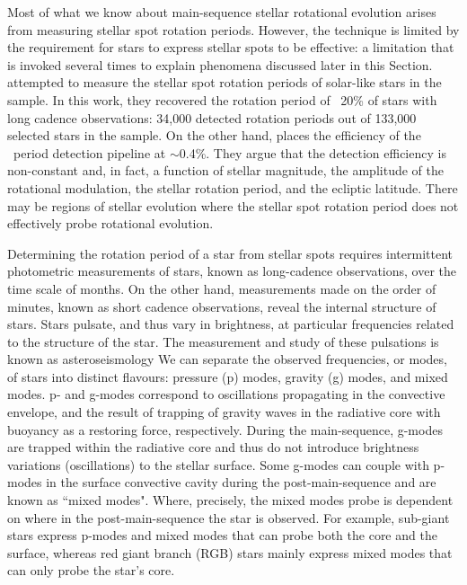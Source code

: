 Most of what we know about main-sequence stellar rotational evolution arises from measuring stellar spot rotation periods.
However, the technique is limited by the requirement for stars to express stellar spots to be effective: a limitation that is invoked several times to explain phenomena discussed later in this Section. 
\citet{mcquillan_rotation_2014} attempted to measure the stellar spot rotation periods of solar-like stars in the \kepler{} sample.
In this work, they recovered the rotation period of ~20\% of stars with long cadence observations: 34,000 detected rotation periods out of 133,000 selected stars in the sample.
On the other hand, \citet{distefano_gaia_2022} places the efficiency of the \GDRT\ period detection pipeline at $\sim$0.4\%.
They argue that the detection efficiency is non-constant and, in fact, a function of stellar magnitude, the amplitude of the rotational modulation, the stellar rotation period, and the ecliptic latitude.
There may be regions of stellar evolution where the stellar spot rotation period does not effectively probe rotational evolution.

Determining the rotation period of a star from stellar spots requires intermittent photometric measurements of stars, known as long-cadence observations, over the time scale of months. 
On the other hand, measurements made on the order of minutes, known as short cadence observations, reveal the internal structure of stars.
Stars pulsate, and thus vary in brightness, at particular frequencies related to the structure of the star. 
The measurement and study of these pulsations is known as asteroseismology \citep[see, e.g.][for thorough overviews]{christensen-dalsgaard_interpretation_1982,christensen-dalsgaard_comparison_1990, aerts_asteroseismology_2010, basu_asteroseismic_2017}
We can separate the observed frequencies, or modes, of stars into distinct flavours: pressure (p) modes, gravity (g) modes, and mixed modes.
p- and g-modes correspond to oscillations propagating in the convective envelope, and the result of trapping of gravity waves in the radiative core with buoyancy as a restoring force, respectively. 
During the main-sequence, g-modes are trapped within the radiative core and thus do not introduce brightness variations (oscillations) to the stellar surface.
Some g-modes can couple with p-modes in the surface convective cavity during the post-main-sequence and are known as ``mixed modes".
Where, precisely, the mixed modes probe is dependent on where in the post-main-sequence the star is observed.
For example, sub-giant stars express p-modes and mixed modes that can probe both the core and the surface, whereas red giant branch (RGB) stars mainly express mixed modes that can only probe the star's core.

